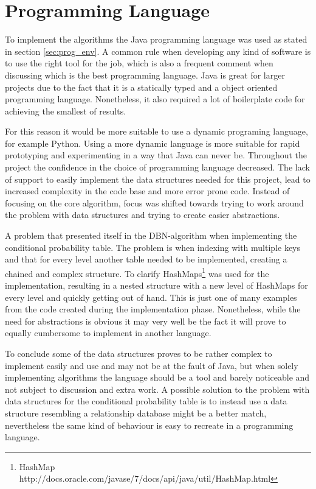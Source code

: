 \section{Programming Language}
\label{ap:prog_lang_eval}
To implement the algorithms the Java programming language was used as stated in section \ref{sec:prog_env}. A common rule when developing any kind of software is to use the right tool for the job, which is also a frequent comment when discussing which is the best programming language. Java is great for larger projects due to the fact that it is a statically typed and a object oriented programming language. Nonetheless, it also required a lot of boilerplate code for achieving the smallest of results. 

For this reason it would be more suitable to use a dynamic programing language, for example Python. Using a more dynamic language is more suitable for rapid prototyping and experimenting in a way that Java can never be. Throughout the project the confidence in the choice of programming language decreased. The lack of support to easily implement the data structures needed for this project, lead to increased complexity in the code base and more error prone code. Instead of focusing on the core algorithm, focus was shifted towards trying to work around the problem with data structures and trying to create easier abstractions. 

A problem that presented itself in the DBN-\etre algorithm when implementing the conditional probability table. The problem is when indexing with multiple keys and that for every level another table needed to be implemented, creating a chained and complex structure. To clarify HashMaps\footnote{HashMap http://docs.oracle.com/javase/7/docs/api/java/util/HashMap.html} was used for the implementation, resulting in a nested structure with a new level of HashMaps for every level and quickly getting out of hand. This is just one of many examples from the code created during the implementation phase. Nonetheless, while the need for abstractions is obvious it may very well be the fact it will prove to equally cumbersome to implement in another language.

To conclude some of the data structures proves to be rather complex to implement easily and use and may not be at the fault of Java, but when solely implementing algorithms the language should be a tool and barely noticeable and not subject to discussion and extra work. A possible solution to the problem with data structures for the conditional probability table is to instead use a data structure resembling a relationship database might be a better match, nevertheless the same kind of behaviour is easy to recreate in a programming language.